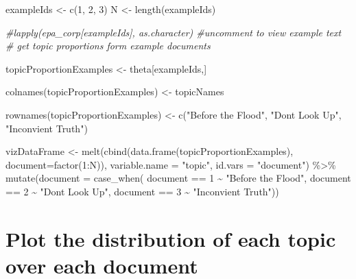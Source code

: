 \documentclass[
]{article}
\newenvironment{Shaded}{\begin{snugshade}}{\end{snugshade}}
\newcommand{\AttributeTok}[1]{\textcolor[rgb]{0.77,0.63,0.00}{#1}}
\newcommand{\CommentTok}[1]{\textcolor[rgb]{0.56,0.35,0.01}{\textit{#1}}}
\newcommand{\DecValTok}[1]{\textcolor[rgb]{0.00,0.00,0.81}{#1}}
\newcommand{\FunctionTok}[1]{\textcolor[rgb]{0.00,0.00,0.00}{#1}}
\newcommand{\NormalTok}[1]{#1}
\newcommand{\OtherTok}[1]{\textcolor[rgb]{0.56,0.35,0.01}{#1}}
\newcommand{\SpecialCharTok}[1]{\textcolor[rgb]{0.00,0.00,0.00}{#1}}
\newcommand{\StringTok}[1]{\textcolor[rgb]{0.31,0.60,0.02}{#1}}
\begin{document}
\begin{Shaded}
\begin{Highlighting}[]
\NormalTok{exampleIds }\OtherTok{\textless{}{-}} \FunctionTok{c}\NormalTok{(}\DecValTok{1}\NormalTok{, }\DecValTok{2}\NormalTok{, }\DecValTok{3}\NormalTok{)}
\NormalTok{N }\OtherTok{\textless{}{-}} \FunctionTok{length}\NormalTok{(exampleIds)}

\CommentTok{\#lapply(epa\_corp[exampleIds], as.character) \#uncomment to view example text}
\CommentTok{\# get topic proportions form example documents}

\NormalTok{topicProportionExamples }\OtherTok{\textless{}{-}}\NormalTok{ theta[exampleIds,]}

\FunctionTok{colnames}\NormalTok{(topicProportionExamples) }\OtherTok{\textless{}{-}}\NormalTok{ topicNames}

\FunctionTok{rownames}\NormalTok{(topicProportionExamples) }\OtherTok{\textless{}{-}} \FunctionTok{c}\NormalTok{(}\StringTok{"Before the Flood"}\NormalTok{, }
                                       \StringTok{"Don\textquotesingle{}t Look Up"}\NormalTok{, }
                                       \StringTok{"Inconvient Truth"}\NormalTok{)}

\NormalTok{vizDataFrame }\OtherTok{\textless{}{-}} \FunctionTok{melt}\NormalTok{(}\FunctionTok{cbind}\NormalTok{(}\FunctionTok{data.frame}\NormalTok{(topicProportionExamples),}
                           \AttributeTok{document=}\FunctionTok{factor}\NormalTok{(}\DecValTok{1}\SpecialCharTok{:}\NormalTok{N)), }
                           \AttributeTok{variable.name =} \StringTok{"topic"}\NormalTok{, }
                           \AttributeTok{id.vars =} \StringTok{"document"}\NormalTok{)  }\SpecialCharTok{\%\textgreater{}\%} 
    \FunctionTok{mutate}\NormalTok{(}\AttributeTok{document =} \FunctionTok{case\_when}\NormalTok{(}
\NormalTok{    document }\SpecialCharTok{==} \DecValTok{1} \SpecialCharTok{\textasciitilde{}} \StringTok{"Before the Flood"}\NormalTok{,}
\NormalTok{    document }\SpecialCharTok{==} \DecValTok{2} \SpecialCharTok{\textasciitilde{}} \StringTok{"Don\textquotesingle{}t Look Up"}\NormalTok{,}
\NormalTok{    document }\SpecialCharTok{==} \DecValTok{3} \SpecialCharTok{\textasciitilde{}} \StringTok{"Inconvient Truth"}\NormalTok{))}
\end{Highlighting}
\end{Shaded}

\hypertarget{plot-the-distribution-of-each-topic-over-each-document}{%
\section{Plot the distribution of each topic over each
document}\label{plot-the-distribution-of-each-topic-over-each-document}}
\end{document}
